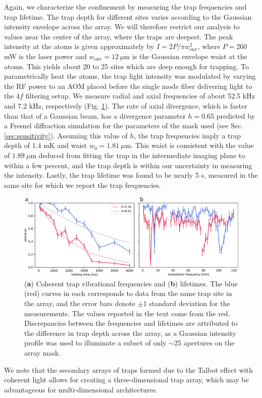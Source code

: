 Again, we characterize the confinement by measuring the trap frequencies and trap lifetime. The trap depth for different sites varies according to the Gaussian intensity envelope across the array. We will therefore restrict our analysis to values near the center of the array, where the traps are deepest. The peak intensity at the atoms is given approximately by $I = 2P/\pi w_{\text{env}}^2$, where $P=260$ mW is the laser power and $w_{\text {env}}=12~\mathrm{ \mu m}$ is the Gaussian envelope waist at the atoms. This yields about 20 to 25 sites which are deep enough for trapping. To parametrically heat the atoms, the trap light intensity was modulated by varying the RF power to an AOM placed before the single mode fiber delivering light to the $4f$ filtering setup. We measure radial and axial frequencies of about 52.5 kHz and 7.2 kHz, respectively (Fig. \ref{fig:coherent_frequencies_and_lifetime}). The rate of axial divergence, which is faster than that of a Gaussian beam, has a divergence parameter $h=0.65$ predicted by a Fresnel diffraction simulation for the parameters of the mask used (see Sec. \ref{sec:sensitivity}). Assuming this value of $h$, the trap frequencies imply a trap depth of $1.4$ mK and waist $w_0=1.81~\mu$m. This waist is consistent with the value of $1.89~\mu$m deduced from fitting the trap in the intermediate imaging plane to within a few percent, and the trap depth is within our uncertainty in measuring the intensity. Lastly, the trap lifetime was found to be nearly 5 s, measured in the same site for which we report the trap frequencies.

\begin{figure}[h]
    \centering
    \includegraphics[width=\textwidth]{Images/coherent_trap_lifetime_and_resonances.pdf}
    \caption{(\textbf{a}) Coherent trap vibrational frequencies and (\textbf{b}) lifetimes. The blue (red) curves in each corresponds to data from the same trap site in the array, and the error bars denote $\pm1$ standard deviation for the measurements. The values reported in the text come from the red. Discrepancies between the frequencies and lifetimes are attributed to the difference in trap depth across the array, as a Gaussian intensity profile was used to illuminate a subset of only $\sim$25 apertures on the array mask.}
    \label{fig:coherent_frequencies_and_lifetime}
\end{figure}
We note that the secondary arrays of traps formed due to the Talbot effect with coherent light allows for creating a three-dimensional trap array, which may be advantageous for multi-dimensional architectures\cite{YWang2016,Barredo2018}.


